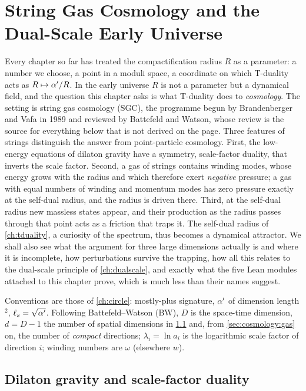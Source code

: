 \chapter{String Gas Cosmology and the Dual-Scale Early Universe}\label{ch:cosmology}

Every chapter so far has treated the compactification radius $R$ as a parameter: a number we
choose, a point in a moduli space, a coordinate on which T-duality acts as $R\mapsto\alpha'/R$.
In the early universe $R$ is not a parameter but a dynamical field, and the question this
chapter asks is what T-duality does to \emph{cosmology}. The setting is string gas
cosmology (SGC), the programme begun by Brandenberger and Vafa
in 1989 and reviewed by Battefeld and Watson, whose review is the source for everything
below that is not derived on the page. Three features of strings distinguish the answer
from point-particle cosmology. First, the low-energy equations of dilaton gravity have a
symmetry, scale-factor duality, that inverts the scale factor. Second, a gas of strings
contains winding modes, whose energy grows with the radius and which therefore exert
\emph{negative} pressure; a gas with equal numbers of winding and momentum modes has zero
pressure exactly at the self-dual radius, and the radius is driven there. Third, at the
self-dual radius new massless states appear, and their production as the radius passes
through that point acts as a friction that traps it. The self-dual radius of
\cref{ch:tduality}, a curiosity of the spectrum, thus becomes a dynamical attractor. We
shall also see what the argument for three large dimensions actually is and where it is
incomplete, how perturbations survive the trapping, how all this relates to the dual-scale
principle of \cref{ch:dualscale}, and exactly what the five Lean modules attached to this
chapter prove, which is much less than their names suggest.

Conventions are those of \cref{ch:circle}: mostly-plus signature, $\alpha'$ of dimension
length$^2$, $\ell_s=\sqrt{\alpha'}$. Following Battefeld--Watson (BW), $D$ is the space-time
dimension, $d=D-1$ the number of spatial dimensions in \cref{sec:cosmology:sfd} and, from
\cref{sec:cosmology:gas} on, the number of \emph{compact} directions; $\lambda_i=\ln a_i$ is
the logarithmic scale factor of direction $i$; winding numbers are $\omega$ (elsewhere $w$).

\section{Dilaton gravity and scale-factor duality}\label{sec:cosmology:sfd}

